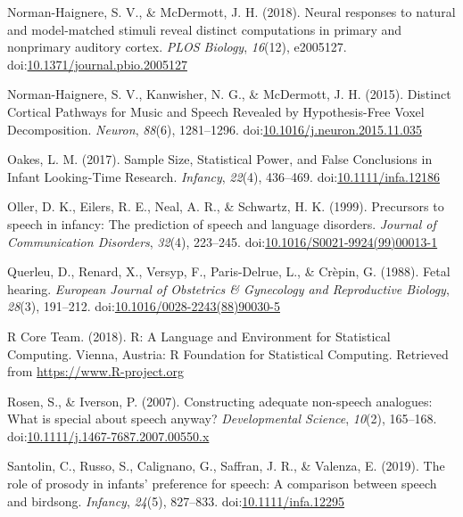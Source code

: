 \documentclass[man]{apa6}
\begin{document}
\hypertarget{ref-norman-haignere_neural_2018}{}
Norman-Haignere, S. V., \& McDermott, J. H. (2018). Neural responses to
natural and model-matched stimuli reveal distinct computations in
primary and nonprimary auditory cortex. \emph{PLOS Biology},
\emph{16}(12), e2005127.
doi:\href{https://doi.org/10.1371/journal.pbio.2005127}{10.1371/journal.pbio.2005127}

\hypertarget{ref-norman-haignere_distinct_2015}{}
Norman-Haignere, S. V., Kanwisher, N. G., \& McDermott, J. H. (2015).
Distinct Cortical Pathways for Music and Speech Revealed by
Hypothesis-Free Voxel Decomposition. \emph{Neuron}, \emph{88}(6),
1281--1296.
doi:\href{https://doi.org/10.1016/j.neuron.2015.11.035}{10.1016/j.neuron.2015.11.035}

\hypertarget{ref-oakes_sample_2017}{}
Oakes, L. M. (2017). Sample Size, Statistical Power, and False
Conclusions in Infant Looking-Time Research. \emph{Infancy},
\emph{22}(4), 436--469.
doi:\href{https://doi.org/10.1111/infa.12186}{10.1111/infa.12186}

\hypertarget{ref-oller_precursors_1999}{}
Oller, D. K., Eilers, R. E., Neal, A. R., \& Schwartz, H. K. (1999).
Precursors to speech in infancy: The prediction of speech and language
disorders. \emph{Journal of Communication Disorders}, \emph{32}(4),
223--245.
doi:\href{https://doi.org/10.1016/S0021-9924(99)00013-1}{10.1016/S0021-9924(99)00013-1}

\hypertarget{ref-querleu_fetal_1988}{}
Querleu, D., Renard, X., Versyp, F., Paris-Delrue, L., \& Crèpin, G.
(1988). Fetal hearing. \emph{European Journal of Obstetrics \&
Gynecology and Reproductive Biology}, \emph{28}(3), 191--212.
doi:\href{https://doi.org/10.1016/0028-2243(88)90030-5}{10.1016/0028-2243(88)90030-5}

\hypertarget{ref-r_core_team_r:_2018}{}
R Core Team. (2018). R: A Language and Environment for Statistical
Computing. Vienna, Austria: R Foundation for Statistical Computing.
Retrieved from \url{https://www.R-project.org}

\hypertarget{ref-rosen_constructing_2007}{}
Rosen, S., \& Iverson, P. (2007). Constructing adequate non-speech
analogues: What is special about speech anyway? \emph{Developmental
Science}, \emph{10}(2), 165--168.
doi:\href{https://doi.org/10.1111/j.1467-7687.2007.00550.x}{10.1111/j.1467-7687.2007.00550.x}

\hypertarget{ref-santolin_role_2019}{}
Santolin, C., Russo, S., Calignano, G., Saffran, J. R., \& Valenza, E.
(2019). The role of prosody in infants' preference for speech: A
comparison between speech and birdsong. \emph{Infancy}, \emph{24}(5),
827--833.
doi:\href{https://doi.org/10.1111/infa.12295}{10.1111/infa.12295}
\end{document}
